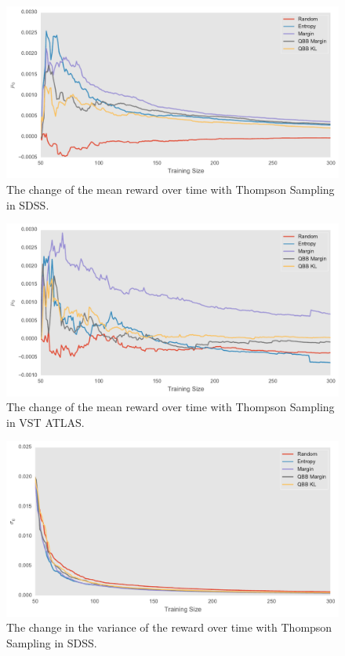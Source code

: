 \begin{figure}[tbp]
	\centering
	\includegraphics[width=\textwidth]{figures/bandit_mu_sdss}
	\caption{The change of the mean reward over time with Thompson Sampling in SDSS.}
	\label{fig:bandit_mu_sdss} 
\end{figure}

\begin{figure}[tbp]
	\centering
	\includegraphics[width=\textwidth]{figures/bandit_mu_vst}
	\caption{The change of the mean reward over time with Thompson Sampling in VST ATLAS.}
	\label{fig:bandit_mu_vst} 
\end{figure}

\begin{figure}[tbp]
	\centering
	\includegraphics[width=\textwidth]{figures/bandit_sigma_sdss}
	\caption{The change in the variance of the reward over time with Thompson Sampling in SDSS.}
	\label{fig:bandit_sigma_sdss} 
\end{figure}

